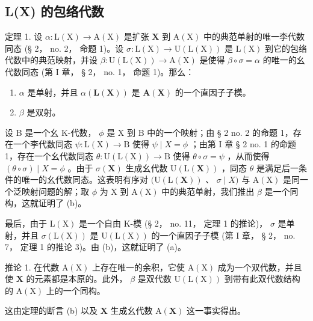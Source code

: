 \subsection{L(X) 的包络代数}

定理 1. 设 \(\alpha: \mathrm{L}(\mathrm{X}) \to \mathrm{A}(\mathrm{X})\) 是扩张 \(\mathbf{X}\) 到 \(\mathrm{A}(\mathrm{X})\) 中的典范单射的唯一李代数同态 (§ 2， no. 2， 命题 1)。设 \(\sigma \colon \mathrm{L}(\mathrm{X}) \to \mathrm{U}(\mathrm{L}(\mathrm{X}))\) 是 \(\mathrm{L}(\mathrm{X})\) 到它的包络代数中的典范映射，并设 \(\beta \colon \mathrm{U}(\mathrm{L}(\mathrm{X})) \to \mathrm{A}(\mathrm{X})\) 是使得 \(\beta \circ \sigma = \alpha\) 的唯一的幺代数同态 (第 I 章， § 2， no. 1， 命题 1)。那么：

\begin{enumerate}
\def\labelenumi{(\alph{enumi})}
\item
  \(\alpha\) 是单射，并且 \(\alpha(\mathbf{L}(\mathbf{X}))\) 是 \(\mathbf{A}(\mathbf{X})\) 的一个直因子子模。
\item
  \(\beta\) 是双射。
\end{enumerate}

设 B 是一个幺 K-代数， \(\phi\) 是 X 到 B 中的一个映射；由 § 2 no. 2 的命题 1，存在一个李代数同态 \(\psi\colon\mathrm{L}(\mathrm{X})\to\mathrm{B}\) 使得 \(\psi\mid X=\phi\) ；由第 I 章 § 2 no. 1 的命题 1，存在一个幺代数同态 \(\theta\colon\mathrm{U}(\mathrm{L}(\mathrm{X}))\to\mathrm{B}\) 使得 \(\theta\circ\sigma=\psi\) ，从而使得 \((\theta\circ\sigma)\mid X=\phi\) 。由于 \(\sigma(\mathbf{X})\) 生成幺代数 \(\mathrm{U}(\mathrm{L}(\mathbf{X}))\) ，同态 \(\theta\) 是满足后一条件的唯一的幺代数同态。这表明有序对 \((\mathrm{U}(\mathrm{L}(\mathbf{X}))\) 、 \(\sigma\mid X)\) 与 \(\mathrm{A}(\mathrm{X})\) 是同一个泛映射问题的解；取 \(\phi\) 为 X 到 \(\mathrm{A}(\mathrm{X})\) 中的典范单射，我们推出 \(\beta\) 是一个同构，这就证明了 (b)。

最后，由于 \(\mathrm{L}(\mathrm{X})\) 是一个自由 K-模 (§ 2， no. 11， 定理 1 的推论)， \(\sigma\) 是单射，并且 \(\sigma(\mathrm{L}(\mathrm{X}))\) 是 \(\mathrm{U}(\mathrm{L}(\mathrm{X}))\) 的一个直因子子模 (第 I 章， § 2， no. 7， 定理 1 的推论 3)。由 (b)，这就证明了 (a)。

推论 1. 在代数 \(\mathrm{A}(\mathrm{X})\) 上存在唯一的余积，它使 \(\mathrm{A}(\mathrm{X})\) 成为一个双代数，并且使 \(\mathbf{X}\) 的元素都是本原的。此外， \(\beta\) 是双代数 \(\mathrm{U}(\mathrm{L}(\mathrm{X}))\) 到带有此双代数结构的 \(\mathrm{A}(\mathrm{X})\) 上的一个同构。

这由定理的断言 (b) 以及 \(\mathbf{X}\) 生成幺代数 \(\mathrm{A}(\mathbf{X})\) 这一事实得出。

